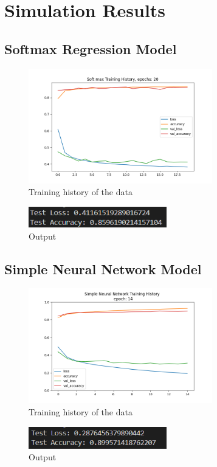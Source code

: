 \documentclass{article}
\begin{document}
\newpage
\section{Simulation Results}
\subsection{Softmax Regression Model}
\begin{figure}[H]
    \caption{Training history of the data}
    \centering
    \includegraphics[width=8cm]{../imgFolder/softMax_fig.png}
\end{figure}

\begin{figure}[H]
    \caption{Output}
    \centering
    \includegraphics[width=6cm]{../imgFolder/softMaxResult.png}
\end{figure}
\subsection{Simple Neural Network Model}

\begin{figure}[H]
    \caption{Training history of the data}
    \centering
    \includegraphics[width=8cm]{../imgFolder/simpleNeuralNetwork_fig.png}
\end{figure}

\begin{figure}[H]
    \caption{Output}
    \centering
    \includegraphics[width=6cm]{../imgFolder/simpleNeuralNetworkResult.png}
\end{figure}
\end{document}
